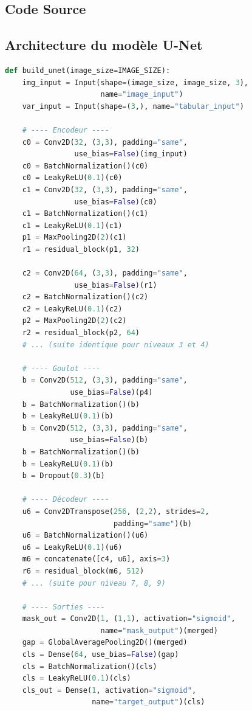 \documentclass[12pt,a4paper,twoside]{report}
\begin{document}
\begin{appendix}
\chapter{Code Source}

\section{Architecture du modèle U-Net}

\begin{lstlisting}[language=Python, caption=Fonction de construction de l'U-Net résiduelle]
def build_unet(image_size=IMAGE_SIZE):
    img_input = Input(shape=(image_size, image_size, 3),
                      name="image_input")
    var_input = Input(shape=(3,), name="tabular_input")

    # ---- Encodeur ----
    c0 = Conv2D(32, (3,3), padding="same",
                use_bias=False)(img_input)
    c0 = BatchNormalization()(c0)
    c0 = LeakyReLU(0.1)(c0)
    c1 = Conv2D(32, (3,3), padding="same",
                use_bias=False)(c0)
    c1 = BatchNormalization()(c1)
    c1 = LeakyReLU(0.1)(c1)
    p1 = MaxPooling2D(2)(c1)
    r1 = residual_block(p1, 32)

    c2 = Conv2D(64, (3,3), padding="same",
                use_bias=False)(r1)
    c2 = BatchNormalization()(c2)
    c2 = LeakyReLU(0.1)(c2)
    p2 = MaxPooling2D(2)(c2)
    r2 = residual_block(p2, 64)
    # ... (suite identique pour niveaux 3 et 4)

    # ---- Goulot ----
    b = Conv2D(512, (3,3), padding="same",
               use_bias=False)(p4)
    b = BatchNormalization()(b)
    b = LeakyReLU(0.1)(b)
    b = Conv2D(512, (3,3), padding="same",
               use_bias=False)(b)
    b = BatchNormalization()(b)
    b = LeakyReLU(0.1)(b)
    b = Dropout(0.3)(b)

    # ---- Décodeur ----
    u6 = Conv2DTranspose(256, (2,2), strides=2,
                         padding="same")(b)
    u6 = BatchNormalization()(u6)
    u6 = LeakyReLU(0.1)(u6)
    m6 = concatenate([c4, u6], axis=3)
    r6 = residual_block(m6, 512)
    # ... (suite pour niveau 7, 8, 9)

    # ---- Sorties ----
    mask_out = Conv2D(1, (1,1), activation="sigmoid",
                      name="mask_output")(merged)
    gap = GlobalAveragePooling2D()(merged)
    cls = Dense(64, use_bias=False)(gap)
    cls = BatchNormalization()(cls)
    cls = LeakyReLU(0.1)(cls)
    cls_out = Dense(1, activation="sigmoid",
                    name="target_output")(cls)


\end{lstlisting}
\end{appendix}
\end{document}
